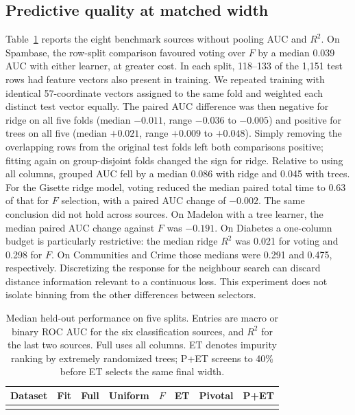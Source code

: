 \subsection{Predictive quality at matched width}
Table~\ref{tab:primary} reports the eight benchmark sources without pooling AUC and $R^2$. On Spambase, the row-split comparison favoured voting over $F$ by a median 0.039 AUC with either learner, at greater cost. In each split, 118--133 of the 1,151 test rows had feature vectors also present in training. We repeated training with identical 57-coordinate vectors assigned to the same fold and weighted each distinct test vector equally. The paired AUC difference was then negative for ridge on all five folds (median $-0.011$, range $-0.036$ to $-0.005$) and positive for trees on all five (median $+0.021$, range $+0.009$ to $+0.048$). Simply removing the overlapping rows from the original test folds left both comparisons positive; fitting again on group-disjoint folds changed the sign for ridge. Relative to using all columns, grouped AUC fell by a median 0.086 with ridge and 0.045 with trees. For the Gisette ridge model, voting reduced the median paired total time to 0.63 of that for $F$ selection, with a paired AUC change of $-0.002$. The same conclusion did not hold across sources. On Madelon with a tree learner, the median paired AUC change against $F$ was $-0.191$. On Diabetes a one-column budget is particularly restrictive: the median ridge $R^2$ was 0.021 for voting and 0.298 for $F$. On Communities and Crime those medians were 0.291 and 0.475, respectively. Discretizing the response for the neighbour search can discard distance information relevant to a continuous loss. This experiment does not isolate binning from the other differences between selectors.

\begin{table}[tbp]
\centering\small
\caption{Median held-out performance on five splits. Entries are macro or binary ROC AUC for the six classification sources, and $R^2$ for the last two sources. Full uses all columns. ET denotes impurity ranking by extremely randomized trees; P+ET screens to 40\% before ET selects the same final width.}
\label{tab:primary}
\setlength{\tabcolsep}{3pt}
\begin{tabular}{@{}llrrrrrr@{}}
\toprule
Dataset & Fit & Full & Uniform & $F$ & ET & Pivotal & P+ET\\
\midrule
\\
\bottomrule
\end{tabular}
\end{table}

